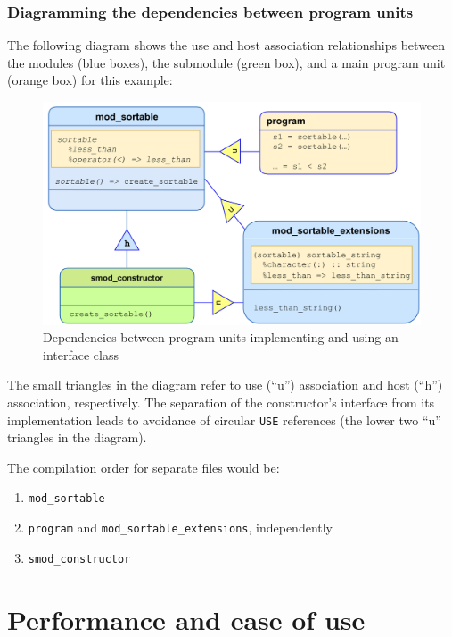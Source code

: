 \documentclass[
  paper=a4,
  ,captions=tableheading
]{scrartcl}
\providecommand{\tightlist}{%
  \setlength{\itemsep}{0pt}\setlength{\parskip}{0pt}}
\begin{document}
\subsubsection{Diagramming the dependencies between program
units}\label{diagramming-the-dependencies-between-program-units}

The following diagram shows the use and host association relationships
between the modules (blue boxes), the submodule (green box), and a main
program unit (orange box) for this example:

\begin{figure}
\centering
\includegraphics[width=5in,height=\textheight,keepaspectratio]{./images/Dependency_inversion.png}
\caption{Dependencies between program units implementing and using an
interface class}
\end{figure}

The small triangles in the diagram refer to use (``u'') association and
host (``h'') association, respectively. The separation of the
constructor's interface from its implementation leads to avoidance of
circular \texttt{USE} references (the lower two ``u'' triangles in the
diagram).

The compilation order for separate files would be:

\begin{enumerate}
\def\labelenumi{\arabic{enumi}.}
\tightlist
\item
  \texttt{mod\_sortable}
\item
  \texttt{program} and \texttt{mod\_sortable\_extensions}, independently
\item
  \texttt{smod\_constructor}
\end{enumerate}

\section{Performance and ease of use}\label{performance-and-ease-of-use}
\end{document}
